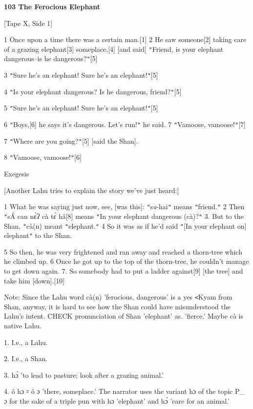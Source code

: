 
\textbf{103 The Ferocious Elephant }

[Tape X, Side 1]

1 Once upon a time there was a certain man.[1] 2 He saw someone[2] taking care
of a grazing elephant[3] someplace,[4] [and said] \texttt{"}Friend, is your elephant
dangerous--is he dangerous?\texttt{"}[5]

3 \texttt{"}Sure he's an elephant! Sure he's an elephant!\texttt{"}[5]

4 \texttt{"}Is your elephant dangerous? Is he dangerous, friend?\texttt{"}[5]

5 \texttt{"}Sure he's an elephant! Sure he's an elephant!\texttt{"}[5]

6 \texttt{"}Boys,[6] he says it's dangerous. Let's run!\texttt{"} he said. 7 \texttt{"}Vamoose,
vamoose!\texttt{"}[7]

7 \texttt{"}Where are you going?\texttt{"}[5] [said the Shan].

8 \texttt{"}Vamoose, vamoose!\texttt{"}[6]

\begin{center}
Exegesis
\end{center}

\leftskip=0pt
[Another Lahu tries to explain the story we've just heard:]

1 What he was saying just now, see, [was this]: \texttt{"}s\textit{a}-hai\texttt{"}
means \texttt{"}friend.\texttt{"} 2 Then \texttt{"}sÁ can nɛ̀ʔ cà tɛ̀ hâ[8]
means \texttt{"}In your elephant dangerous (cà)?\texttt{"} 3. But to the Shan,
\texttt{"}cà(n) meant \texttt{"}elephant.\texttt{"} 4 So it was as if he'd said
\texttt{"}[In your elephant on] elephant\texttt{"} to the Shan.

5 So then, he was very frightened and ran away and reached a thorn-tree which he
climbed up. 6 Once he got up to the top of the thorn-tree, he couldn't manage to
get down again. 7. So somebody had to put a ladder against[9] [the tree] and take
him [down].[10]

Note: Since the Lahu word cà(n) 'ferocious, dangerous' is a yes \texttt{<}Kyam
from Shan, anyway, it is hard to see how the Shan could have misunderstood the
Lahu's intent. CHECK pronunciation of Shan 'elephant' as. 'fierce.' Maybe cà is
native Lahu.

1. I.e., a Lahu.

2. I.e., a Shan.

3. hɔ́ 'to lead to pasture; look after a grazing animal.'

4. ô hɔ ꞊ ô ɔ 'there, someplace.' The narrator uses the variant hɔ of the
topic P_{} \emph{ɔ} for the sake of a triple pun with hɔ 'elephant' and hɔ́
'care for an animal.'

